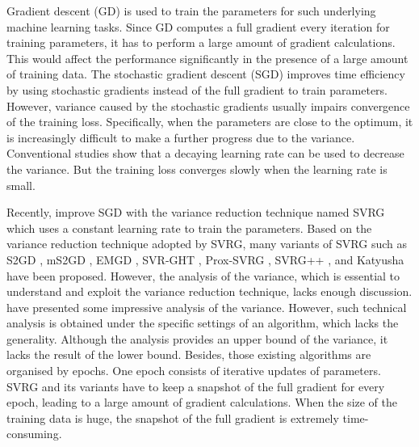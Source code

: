 \documentclass[letterpaper]{article}
\begin{document}
Gradient descent (GD) is used to train the parameters for such underlying machine learning tasks. Since GD computes a full gradient every iteration for training parameters, it has to perform a large amount of gradient calculations.  This would affect the performance significantly in the presence of a large amount of training data. The stochastic gradient descent (SGD) improves time efficiency by using stochastic gradients instead of the full gradient to train parameters. However, variance caused by the stochastic gradients usually impairs convergence of the training loss. Specifically, when the parameters are close to the optimum, it is increasingly difficult to make a further progress  due to the variance. Conventional studies show that a decaying learning rate can be used to decrease the variance. But the training loss converges slowly when the learning rate is small. 

Recently, \citet{Johnson:9MAvkbgy} improve SGD with the variance reduction technique named SVRG which uses a constant learning rate to train the parameters.  Based on the variance reduction technique adopted by SVRG, many variants of SVRG such as S2GD \citep{Richtarik:2013te}, mS2GD \citep{Liu:2015bx}, EMGD \citep{Zhang2013Linear}, SVR-GHT \citep{Li:2016vh}, Prox-SVRG \citep{Xiao:2014vw}, SVRG++ \citep{Allen2015Improved}, and Katyusha \citep{Allenzhu2016Katyusha} have been proposed. However, the analysis of the variance, which is essential to understand and exploit the variance reduction technique, lacks enough discussion. \citet{AllenZhu:2016up} have  presented some impressive analysis of the variance. However, such technical analysis is obtained under the specific settings of an algorithm, which lacks the generality. Although the analysis provides an upper bound of the variance, it lacks the result of the lower bound. Besides, those existing algorithms are organised by epochs. One epoch consists of iterative updates of parameters. SVRG and its variants have to keep a snapshot of the full gradient for every epoch, leading to a large amount of gradient calculations. When the size of the training data is huge, the snapshot of the full gradient is extremely time-consuming.   
 
\end{document}
